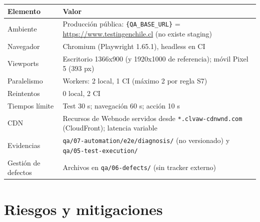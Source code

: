 \documentclass[11pt,a4paper]{article}
\newcommand{\baseurl}{\texttt{\{QA\_BASE\_URL\}}}
\begin{document}
\begin{table}[H]
\centering\small
\begin{tabularx}{\textwidth}{@{}>{\raggedright\arraybackslash}p{} X@{}}
\toprule
Elemento & Valor \\
\midrule
Ambiente & Producción pública: \baseurl{} = \url{https://www.testingenchile.cl} (no existe staging) \\
Navegador & Chromium (Playwright 1.65.1), headless en CI \\
Viewports & Escritorio 1366x900 (y 1920x1000 de referencia); móvil Pixel 5 (393 px) \\
Paralelismo & Workers: 2 local, 1 CI (máximo 2 por regla S7) \\
Reintentos & 0 local, 2 CI \\
Tiempos límite & Test 30 s; navegación 60 s; acción 10 s \\
CDN & Recursos de Webnode servidos desde \texttt{*.clvaw-cdnwnd.com} (CloudFront); latencia variable \\
Evidencias & \texttt{qa/07-automation/e2e/diagnosis/} (no versionado) y \texttt{qa/05-test-execution/} \\
Gestión de defectos & Archivos en \texttt{qa/06-defects/} (sin tracker externo) \\
\bottomrule
\end{tabularx}
\end{table}

\section{Riesgos y mitigaciones}
\end{document}
